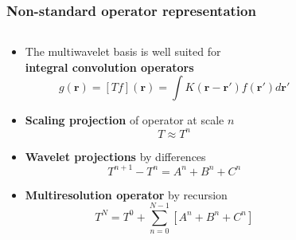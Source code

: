 
\begin{frame}
    \frametitle{Non-standard operator representation}
    \scriptsize
    \begin{columns}
    \begin{column}[b]{0.6\linewidth}
    \begin{itemize}
	\item	The multiwavelet basis is well suited for\\ 
        \textbf{integral convolution operators}
	    \begin{equation}
		\nonumber
		g(\boldsymbol{r}) = \left[T f\right](\boldsymbol{r}) = 
		    \int K(\boldsymbol{r} - \boldsymbol{r'})f(\boldsymbol{r'}) d\boldsymbol{r'}
	    \end{equation}
        \pause
	\item \textbf{Scaling projection} of operator at scale $n$
	    \begin{equation}
		\nonumber
		T \approx T^n
	    \end{equation}
        \pause
	\item \textbf{Wavelet projections} by differences
	    \begin{equation}
		\nonumber
		T^{n+1} - T^n = A^n + B^n + C^n
	    \end{equation}
        \pause\pause\pause\pause
	\item \textbf{Multiresolution operator} by recursion
	    \begin{equation}
		\nonumber
		T^N = T^0 + \sum_{n=0}^{N-1} \left[A^n + B^n + C^n\right]
	    \end{equation}
    \end{itemize}
    \end{column}
    \begin{column}[b]{0.4\linewidth}
    \begin{center}
\end{center}
\end{column}
\end{columns}
\end{frame}
